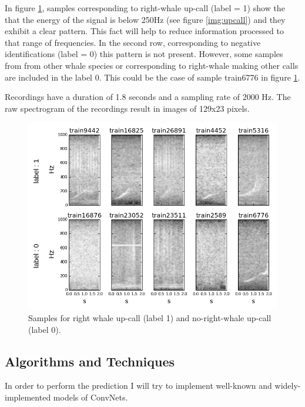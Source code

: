 \documentclass[]{article}
\begin{document}
In figure \ref{img:samples}, samples corresponding to right-whale up-call (label = 1) show the that the energy of the signal is below 250Hz (see figure \ref{img:upcall}) and they exhibit a clear pattern. This fact will help to reduce information processed to that range of frequencies. 
In the second row, corresponding to negative identifications (label = 0) this pattern is not present. However, some samples from from other whale species or corresponding to right-whale making other calls are included in the label 0. This could be the case of sample train6776 in figure \ref{img:samples}.

Recordings have a duration of 1.8 seconds and a sampling rate of 2000 Hz. The raw spectrogram of the recordings result in images of 129x23 pixels.

\begin{figure}[htpb!]
\centering
\includegraphics[width= \textwidth]{./images/2_samples}
\caption{Samples for right whale up-call (label 1) and no-right-whale up-call (label 0).  \label{img:samples}}
\end{figure} 


\subsection{Algorithms and Techniques}\label{algorithms-and-techniques}

In order to perform the prediction I will try to implement well-known and widely-implemented models of ConvNets.
\end{document}
